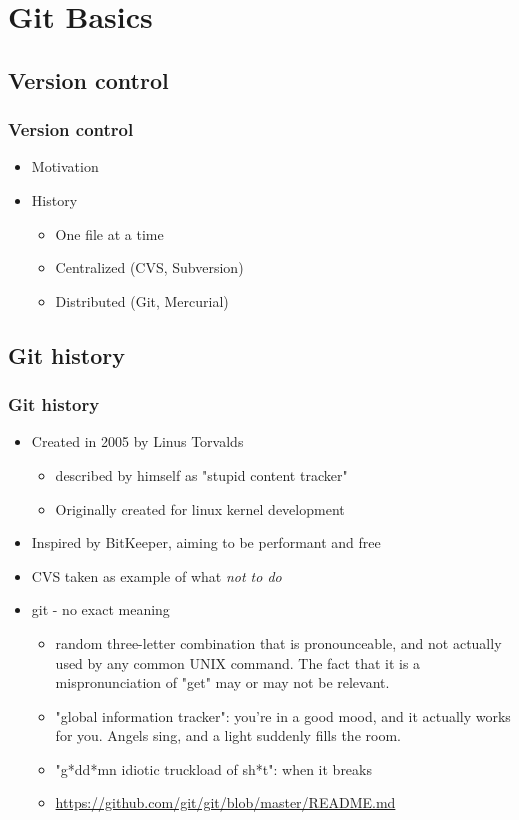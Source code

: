 \section[Git Basics]{Git Basics}
\subsection[]{Version control}
\begin{frame}
\frametitle{Version control}
\begin{itemize}
	\item Motivation
	\item History
		\begin{itemize}
		\item One file at a time
		\item Centralized (CVS, Subversion)
		\item Distributed (Git, Mercurial)
		\end{itemize}
\end{itemize}
\end{frame}

\subsection[]{Git history}
\begin{frame}
\frametitle{Git history}
\begin{itemize}
	\item Created in 2005 by Linus Torvalds 
		\begin{itemize}
		\item described by himself as "stupid content tracker"
		\item Originally created for linux kernel development
		\end{itemize}
	\item Inspired by BitKeeper, aiming to be performant and free
	\item CVS taken as example of what \textit{not to do}
	\item git - no exact meaning
		\begin{itemize}
		\item random three-letter combination that is pronounceable, and not actually used by any common UNIX command. The fact that it is a mispronunciation of "get" may or may not be relevant.
		\item "global information tracker": you're in a good mood, and it actually works for you. Angels sing, and a light suddenly fills the room.
		\item "g*dd*mn idiotic truckload of sh*t": when it breaks
		\item \url{https://github.com/git/git/blob/master/README.md} 
		\end{itemize}	
\end{itemize}
\end{frame}



